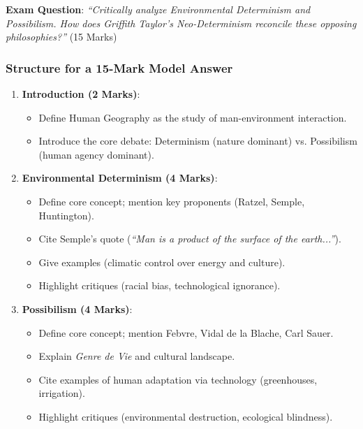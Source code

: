 \documentclass[11pt,a4paper]{article}
\begin{document}
\begin{exambox}
\textbf{Exam Question}: \textit{``Critically analyze Environmental Determinism and Possibilism. How does Griffith Taylor's Neo-Determinism reconcile these opposing philosophies?''} (15 Marks)
\end{exambox}

\subsubsection{Structure for a 15-Mark Model Answer}
\begin{enumerate}[leftmargin=*]
  \item \textbf{Introduction (2 Marks)}:
  \begin{itemize}
    \item Define Human Geography as the study of man-environment interaction.
    \item Introduce the core debate: Determinism (nature dominant) vs. Possibilism (human agency dominant).
  \end{itemize}
  
  \item \textbf{Environmental Determinism (4 Marks)}:
  \begin{itemize}
    \item Define core concept; mention key proponents (Ratzel, Semple, Huntington).
    \item Cite Semple's quote (\textit{``Man is a product of the surface of the earth...''}).
    \item Give examples (climatic control over energy and culture).
    \item Highlight critiques (racial bias, technological ignorance).
  \end{itemize}

  \item \textbf{Possibilism (4 Marks)}:
  \begin{itemize}
    \item Define core concept; mention Febvre, Vidal de la Blache, Carl Sauer.
    \item Explain \textit{Genre de Vie} and cultural landscape.
    \item Cite examples of human adaptation via technology (greenhouses, irrigation).
    \item Highlight critiques (environmental destruction, ecological blindness).
  \end{itemize}


\end{enumerate}
\end{document}
